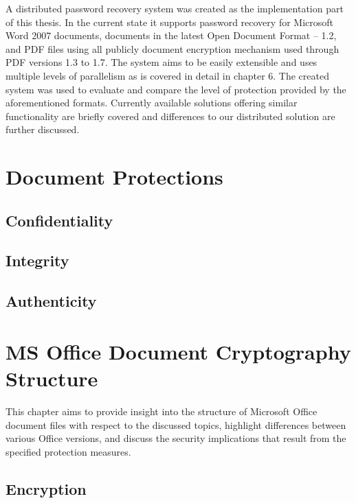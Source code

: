 \documentclass[11pt,oneside]{fithesis2}
\begin{document}
A distributed password recovery system was created as the implementation part of this thesis. In the current state it supports password recovery for Microsoft Word 2007 documents, documents in the latest Open Document Format -- 1.2, and PDF files using all publicly document encryption mechanism used through PDF versions 1.3 to 1.7. The system aims to be easily extensible and uses multiple levels of  parallelism as is covered in detail in chapter 6. The created system was used to evaluate and compare the level of protection provided by the aforementioned formats. Currently available solutions offering similar functionality are briefly covered and differences to our distributed solution are further discussed.
 
\chapter{Document Protections}

\section{Confidentiality}

\section{Integrity}

\section{Authenticity}

\chapter{MS Office Document Cryptography Structure}

This chapter aims to provide insight into the structure of Microsoft Office document files with respect to the discussed topics, highlight differences between various Office versions, and discuss the security implications that result from the specified protection measures.

\section{Encryption}\label{ms_encryption}
\end{document}
